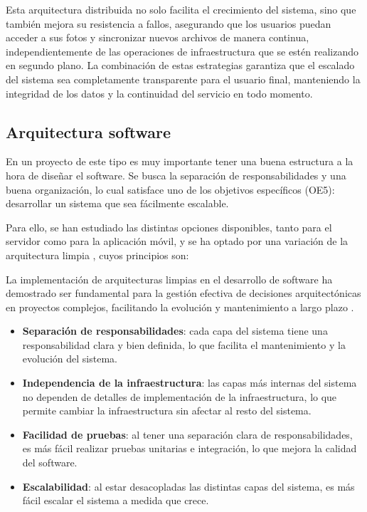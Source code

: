 Esta arquitectura distribuida no solo facilita el crecimiento del sistema, sino que también mejora su resistencia a fallos, asegurando que los usuarios puedan acceder a sus fotos y sincronizar nuevos archivos de manera continua, independientemente de las operaciones de infraestructura que se estén realizando en segundo plano. La combinación de estas estrategias garantiza que el escalado del sistema sea completamente transparente para el usuario final, manteniendo la integridad de los datos y la continuidad del servicio en todo momento.

\subsection{Arquitectura software}
En un proyecto de este tipo es muy importante tener una buena estructura a la hora de diseñar el software.
Se busca la separación de responsabilidades y una buena organización, lo cual satisface uno de los objetivos específicos (OE5): desarrollar un sistema que sea fácilmente escalable.

Para ello, se han estudiado las distintas opciones disponibles, tanto para el servidor como para la aplicación móvil, y se ha optado por una variación de la arquitectura limpia \parencite{uncle-bob-clean-architecture}, cuyos principios son:

La implementación de arquitecturas limpias en el desarrollo de software ha demostrado ser fundamental para la gestión efectiva de decisiones arquitectónicas en proyectos complejos, facilitando la evolución y mantenimiento a largo plazo \parencite{schellander2025concept}.

\begin{itemize}
    \item \textbf{Separación de responsabilidades}: cada capa del sistema tiene una responsabilidad clara y bien definida, lo que facilita el mantenimiento y la evolución del sistema.
    \item \textbf{Independencia de la infraestructura}: las capas más internas del sistema no dependen de detalles de implementación de la infraestructura, lo que permite cambiar la infraestructura sin afectar al resto del sistema.
    \item \textbf{Facilidad de pruebas}: al tener una separación clara de responsabilidades, es más fácil realizar pruebas unitarias e integración, lo que mejora la calidad del software.
    \item \textbf{Escalabilidad}: al estar desacopladas las distintas capas del sistema, es más fácil escalar el sistema a medida que crece.
\end{itemize}

